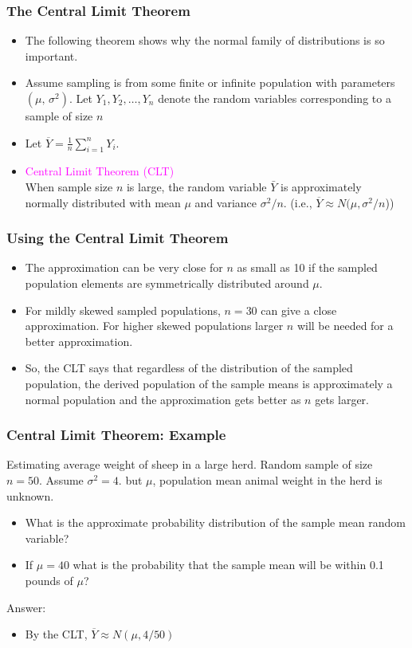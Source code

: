\documentclass[xcolor=dvipsnames,12pt]{beamer}
\begin{document}
\begin{frame}
\frametitle{The Central Limit Theorem}
\begin{itemize}
\item The following theorem shows why the normal family of distributions 
is so important.
\item Assume sampling is from some finite or infinite population
with parameters $(\mu,\,\sigma^2)$. Let $Y_1, Y_2, \ldots, Y_n$ 
denote the random variables corresponding to a sample of  size $n$
\item Let
$\overline{Y} = \frac1n \displaystyle\sum_{i=1}^n Y_i$.
\item \textcolor{magenta}{Central Limit Theorem (CLT)}\\[.1in]
When sample size $n$ is large, the random variable
$\bar{Y}$ is approximately normally distributed with
mean $\mu$ and variance $\sigma^2/n$.  (i.e.,
$\overline{Y} \approx N (\mu, \sigma^2/n$))
\end{itemize}
\end{frame}


\begin{frame}
\frametitle{Using the Central Limit Theorem}
\begin{itemize}
\item The approximation can be very close for $n$ as small as
10 if the sampled population elements are symmetrically
distributed around $\mu$.  
\item For mildly skewed sampled populations, $n=30$ can give a close approximation.
For higher skewed populations larger $n$ will be
needed for a better approximation.
\item So, the CLT says that regardless of the distribution of
 the sampled population, the derived
population of the sample means is approximately a normal population
and the approximation gets better as $n$ gets larger.
\end{itemize}
\end{frame}


\begin{frame}
\frametitle{Central Limit Theorem: Example}
 Estimating average weight of sheep in a large
herd.  Random sample of  size $n=50$.  Assume $\sigma^2=4$.
but $\mu$, population mean animal weight in the herd is unknown.
\begin{itemize}
\item[a)] What is the approximate probability distribution
of the sample mean random variable?
\item[b)] If $\mu=40$ what is the probability that the
sample mean will be within 0.1 pounds of $\mu$?
\end{itemize}
 Answer:
\begin{itemize}
\item[a)] By the CLT, $\overline{Y} \approx N (\mu, 4/50) $
\end{itemize}
\end{frame}
\end{document}
